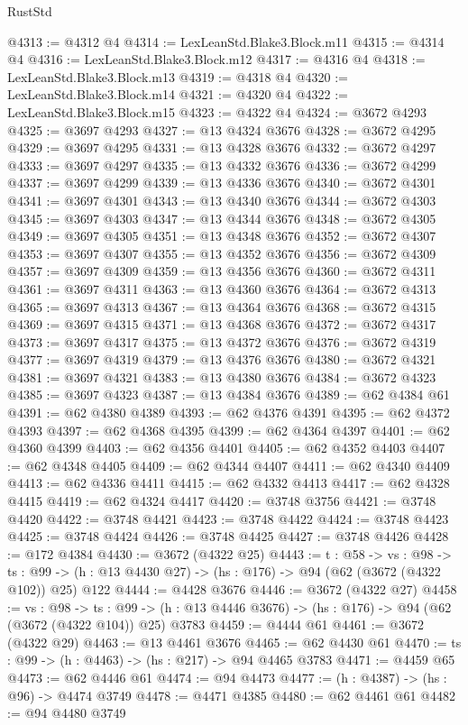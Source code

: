 \begin{lexlean}{RustStd}
\begin{coremodule}
{\begin{coremodule}
{{{{{{{{{@4313 := @4312 @4
@4314 := LexLeanStd.Blake3.Block.m11
@4315 := @4314 @4
@4316 := LexLeanStd.Blake3.Block.m12
@4317 := @4316 @4
@4318 := LexLeanStd.Blake3.Block.m13
@4319 := @4318 @4
@4320 := LexLeanStd.Blake3.Block.m14
@4321 := @4320 @4
@4322 := LexLeanStd.Blake3.Block.m15
@4323 := @4322 @4
@4324 := @3672 @4293
@4325 := @3697 @4293
@4327 := @13 @4324 @3676
@4328 := @3672 @4295
@4329 := @3697 @4295
@4331 := @13 @4328 @3676
@4332 := @3672 @4297
@4333 := @3697 @4297
@4335 := @13 @4332 @3676
@4336 := @3672 @4299
@4337 := @3697 @4299
@4339 := @13 @4336 @3676
@4340 := @3672 @4301
@4341 := @3697 @4301
@4343 := @13 @4340 @3676
@4344 := @3672 @4303
@4345 := @3697 @4303
@4347 := @13 @4344 @3676
@4348 := @3672 @4305
@4349 := @3697 @4305
@4351 := @13 @4348 @3676
@4352 := @3672 @4307
@4353 := @3697 @4307
@4355 := @13 @4352 @3676
@4356 := @3672 @4309
@4357 := @3697 @4309
@4359 := @13 @4356 @3676
@4360 := @3672 @4311
@4361 := @3697 @4311
@4363 := @13 @4360 @3676
@4364 := @3672 @4313
@4365 := @3697 @4313
@4367 := @13 @4364 @3676
@4368 := @3672 @4315
@4369 := @3697 @4315
@4371 := @13 @4368 @3676
@4372 := @3672 @4317
@4373 := @3697 @4317
@4375 := @13 @4372 @3676
@4376 := @3672 @4319
@4377 := @3697 @4319
@4379 := @13 @4376 @3676
@4380 := @3672 @4321
@4381 := @3697 @4321
@4383 := @13 @4380 @3676
@4384 := @3672 @4323
@4385 := @3697 @4323
@4387 := @13 @4384 @3676
@4389 := @62 @4384 @61
@4391 := @62 @4380 @4389
@4393 := @62 @4376 @4391
@4395 := @62 @4372 @4393
@4397 := @62 @4368 @4395
@4399 := @62 @4364 @4397
@4401 := @62 @4360 @4399
@4403 := @62 @4356 @4401
@4405 := @62 @4352 @4403
@4407 := @62 @4348 @4405
@4409 := @62 @4344 @4407
@4411 := @62 @4340 @4409
@4413 := @62 @4336 @4411
@4415 := @62 @4332 @4413
@4417 := @62 @4328 @4415
@4419 := @62 @4324 @4417
@4420 := @3748 @3756
@4421 := @3748 @4420
@4422 := @3748 @4421
@4423 := @3748 @4422
@4424 := @3748 @4423
@4425 := @3748 @4424
@4426 := @3748 @4425
@4427 := @3748 @4426
@4428 := @172 @4384
@4430 := @3672 (@4322 @25)
@4443 := {t : @58} ->
  {vs : @98} ->
  {ts : @99} -> (h : @13 @4430 @27) -> (hs : @176) -> @94 (@62 (@3672 (@4322 @102)) @25) @122
@4444 := @4428 @3676
@4446 := @3672 (@4322 @27)
@4458 := {vs : @98} ->
  {ts : @99} -> (h : @13 @4446 @3676) -> (hs : @176) -> @94 (@62 (@3672 (@4322 @104)) @25) @3783
@4459 := @4444 @61
@4461 := @3672 (@4322 @29)
@4463 := @13 @4461 @3676
@4465 := @62 @4430 @61
@4470 := {ts : @99} -> (h : @4463) -> (hs : @217) -> @94 @4465 @3783
@4471 := @4459 @65
@4473 := @62 @4446 @61
@4474 := @94 @4473
@4477 := (h : @4387) -> (hs : @96) -> @4474 @3749
@4478 := @4471 @4385
@4480 := @62 @4461 @61
@4482 := @94 @4480 @3749
}}}}}}}}}
\end{coremodule}}
\end{coremodule}
\end{lexlean}
